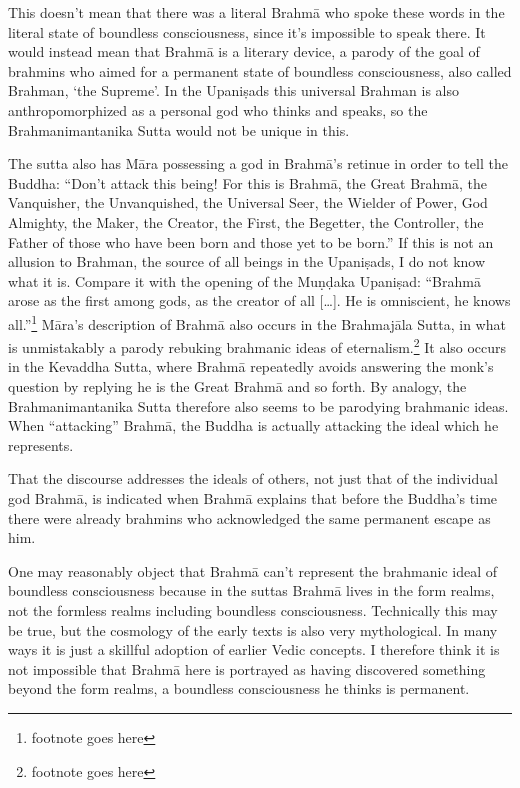 \documentclass[10pt, openany]{book}
\begin{document}
This doesn’t mean that there was a literal Brahmā who spoke these words in the literal state of boundless consciousness, since it’s impossible to speak there. It would instead mean that Brahmā is a literary device, a parody of the goal of brahmins who aimed for a permanent state of boundless consciousness, also called Brahman, ‘the Supreme’. In the Upaniṣads this universal Brahman is also anthropomorphized as a personal god who thinks and speaks, so the Brahmanimantanika Sutta would not be unique in this.


The sutta also has Māra possessing a god in Brahmā’s retinue in order to tell the Buddha: “Don’t attack this being! For this is Brahmā, the Great Brahmā, the Vanquisher, the Unvanquished, the Universal Seer, the Wielder of Power, God Almighty, the Maker, the Creator, the First, the Begetter, the Controller, the Father of those who have been born and those yet to be born.” If this is not an allusion to Brahman, the source of all beings in the Upaniṣads, I do not know what it is. Compare it with the opening of the Muṇḍaka Upaniṣad: “Brahmā arose as the first among gods, as the creator of all […]. He is omniscient, he knows all.”\footnote{footnote goes here} Māra’s description of Brahmā also occurs in the Brahmajāla Sutta, in what is unmistakably a parody rebuking brahmanic ideas of eternalism.\footnote{footnote goes here} It also occurs in the Kevaddha Sutta, where Brahmā repeatedly avoids answering the monk’s question by replying he is the Great Brahmā and so forth. By analogy, the Brahmanimantanika Sutta therefore also seems to be parodying brahmanic ideas. When “attacking” Brahmā, the Buddha is actually attacking the ideal which he represents.


That the discourse addresses the ideals of others, not just that of the individual god Brahmā, is indicated when Brahmā explains that before the Buddha’s time there were already brahmins who acknowledged the same permanent escape as him.


One may reasonably object that Brahmā can’t represent the brahmanic ideal of boundless consciousness because in the suttas Brahmā lives in the form realms, not the formless realms including boundless consciousness. Technically this may be true, but the cosmology of the early texts is also very mythological. In many ways it is just a skillful adoption of earlier Vedic concepts. I therefore think it is not impossible that Brahmā here is portrayed as having discovered something beyond the form realms, a boundless consciousness he thinks is permanent.
\end{document}
